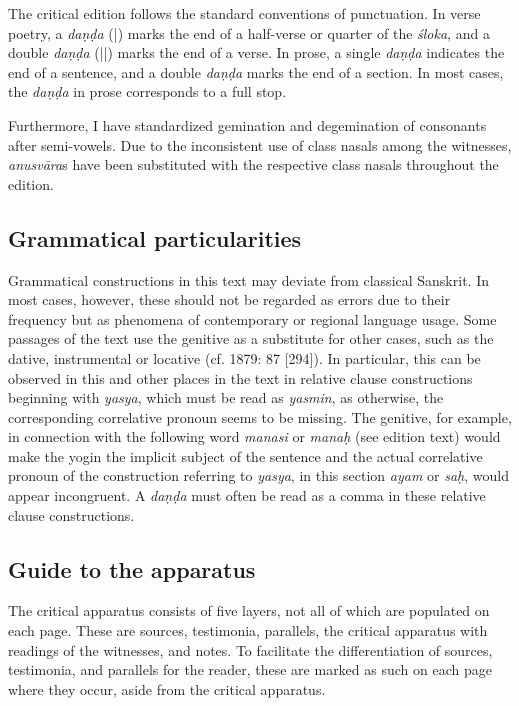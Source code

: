 The critical edition follows the standard conventions of punctuation. In verse poetry, a \textit{daṇḍa} (|) marks the end of a half-verse or quarter of the \textit{śloka}, and a double \textit{daṇḍa} (||) marks the end of a verse. In prose, a single \textit{daṇḍa} indicates the end of a sentence, and a double \textit{daṇḍa} marks the end of a section. In most cases, the \textit{daṇḍa} in prose corresponds to a full stop.

Furthermore, I have standardized gemination and degemination of consonants after semi-vowels. Due to the inconsistent use of class nasals among the witnesses, \textit{anusvāra}s have been substituted with the respective class nasals throughout the edition.

\subsection{Grammatical particularities}

Grammatical constructions in this text may deviate from classical Sanskrit. In most cases, however, these should not be regarded as errors due to their frequency but as phenomena of contemporary or regional language usage. Some passages of the text use the genitive as a substitute for other cases, such as the dative, instrumental or locative (cf. \citeauthor{whitney1879} 1879: 87 [294]). In particular, this can be observed in this and other places in the text in relative clause constructions beginning with \textit{yasya}, which must be read as \textit{yasmin}, as otherwise, the corresponding correlative pronoun seems to be missing. The genitive, for example, in connection with the following word \textit{manasi} or \textit{manaḥ} (see edition text) would make the yogin the implicit subject of the sentence and the actual correlative pronoun of the construction referring to \textit{yasya}, in this section \textit{ayam} or \textit{saḥ}, would appear incongruent. A \textit{daṇḍa} must often be read as a comma in these relative clause constructions.

\subsection{Guide to the apparatus}

The critical apparatus consists of five layers, not all of which are populated on each page. These are sources, testimonia, parallels, the critical apparatus with readings of the witnesses, and notes. To facilitate the differentiation of sources, testimonia, and parallels for the reader, these are marked as such on each page where they occur, aside from the critical apparatus.

